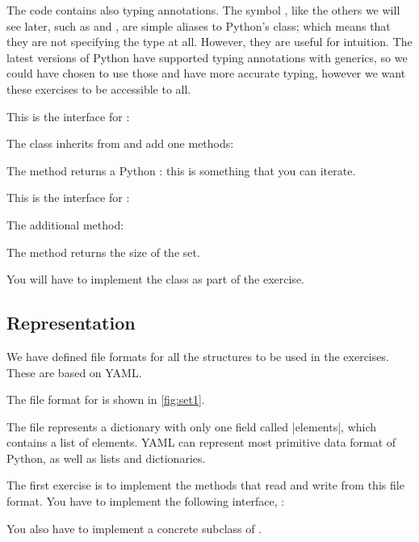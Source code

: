 The code contains also typing annotations.
The symbol , like the others we will see later, such as  and , are simple aliases to Python's  class; which means that they are not specifying the type at all.
However, they are useful for intuition.
The latest versions of Python have supported typing annotations with generics, so we could have chosen to use those and have more accurate typing, however we want these exercises to be accessible to all.


This is the interface for :


The class inherits from \Setoid and add one methods:
\begin{compactitem}
  \item The method  returns a Python : this is something that you can iterate.
\end{compactitem}
This is the interface for \FiniteSet:


The additional method:
\begin{compactitem}
  \item The method  returns the size of the set.
\end{compactitem}

You will have to implement the \FiniteSet class as part of the exercise.


\subsection*{Representation}

We have defined file formats for all the structures to be used in the exercises.
These are based on YAML\@.


The file format for \FiniteSet is shown in \cref{fig:set1}.



The file represents a dictionary with only one field called \pystr|elements|, which contains a list of elements.
YAML can represent most primitive data format of Python, as well as lists and dictionaries.

\begin{gradedexercise}
  \label{ex:setrepr}
  The first exercise is to implement the methods that read and write from this file format.
  You have to implement the following interface, :


  You also have to implement a concrete subclass of \FiniteSet.
\end{gradedexercise}

